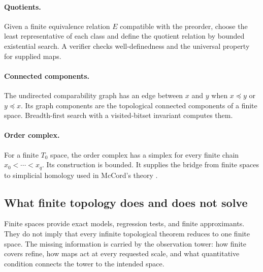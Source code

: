 \paragraph{Quotients.}
Given a finite equivalence relation $E$ compatible with the preorder, choose the least representative of each class and define the quotient relation by bounded existential search.  A verifier checks well-definedness and the universal property for supplied maps.

\paragraph{Connected components.}
The undirected comparability graph has an edge between $x$ and $y$ when $x\preceq y$ or $y\preceq x$.  Its graph components are the topological connected components of a finite space.  Breadth-first search with a visited-bitset invariant computes them.

\paragraph{Order complex.}
For a finite $T_0$ space, the order complex has a simplex for every finite chain $x_0<\cdots<x_q$.  Its construction is bounded.  It supplies the bridge from finite spaces to simplicial homology used in McCord's theory \cite{McCord1966}.

\subsection{What finite topology does and does not solve}

Finite spaces provide exact models, regression tests, and finite approximants.  They do not imply that every infinite topological theorem reduces to one finite space.  The missing information is carried by the observation tower: how finite covers refine, how maps act at every requested scale, and what quantitative condition connects the tower to the intended space.
